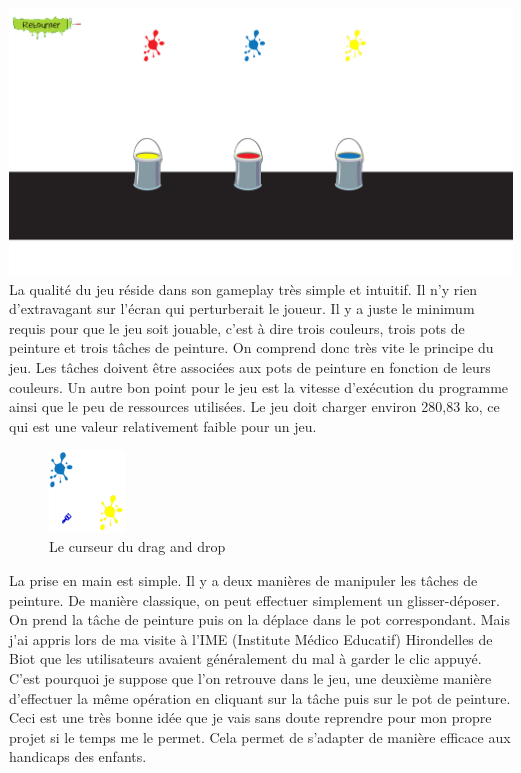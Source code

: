 \documentclass{article}
\begin{document}
\vspace{0.5cm}
\includegraphics[width=\textwidth]{4}\\
\hspace*{0.6cm}La qualité du jeu réside dans son gameplay très simple et intuitif. Il n'y rien d'extravagant sur l'écran qui perturberait le joueur. Il y a juste le minimum requis pour que le jeu soit jouable, c'est à dire trois couleurs, trois pots de peinture et trois tâches de peinture. On comprend donc très vite le principe du jeu. Les t\^aches doivent être associées aux pots de peinture en fonction de leurs couleurs. Un autre bon point pour le jeu est la vitesse d'exécution du programme ainsi que le peu de ressources utilisées. Le jeu doit charger environ 280,83 ko, ce qui est une valeur relativement faible pour un jeu.\\

\begin{figure}
  \vspace{-20pt}
  \begin{center}
    \includegraphics[width=0.18\textwidth]{10}
  \end{center}
  \vspace{-20pt}
  \caption{Le curseur du drag and drop}
  \vspace{-10pt}
\end{figure}

La prise en main est simple. Il y a deux manières de manipuler les tâches de peinture. De manière classique, on peut effectuer simplement un glisser-déposer. On prend la t\^ache de peinture puis on la déplace dans le pot correspondant. Mais j'ai appris lors de ma visite à l'IME (Institute Médico Educatif) Hirondelles de Biot que les utilisateurs avaient généralement du mal à garder le clic appuyé. C'est pourquoi je suppose que l'on retrouve dans le jeu, une deuxième manière d'effectuer la même opération en cliquant sur la tâche puis sur le pot de peinture. Ceci est une très bonne idée que je vais sans doute reprendre pour mon propre projet si le temps me le permet. Cela permet de s'adapter de manière efficace aux handicaps des enfants.\\
\end{document}
